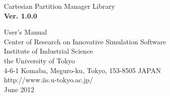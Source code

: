 \documentclass[11pt]{jsarticle}
\begin{document}
\begin{titlepage}
\center
\vspace*{3cm}
\huge
Cartesian Partition Manager Library\\
{\large \textbf{Ver. 1.0.0}}\\
\vspace*{1cm}

User's Manual\\

\vspace*{5cm}
\normalsize
Center of Research on Innovative Simulation Software\\
Institute of Industrial Science\\
the University of Tokyo\\
\vspace*{1.0cm}
\small
4-6-1 Komaba, Meguro-ku, Tokyo, 153-8505 JAPAN\\
\vspace*{0.5cm}
http://www.iis.u-tokyo.ac.jp/\\
\vspace*{1.5cm}
June 2012
\end{titlepage}

\tableofcontents
\clearpage


















\end{document}
